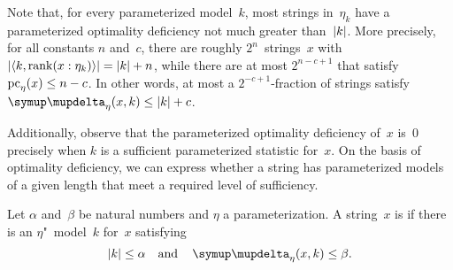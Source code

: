 Note that, for every parameterized model~$k$, most strings in~$\eta_k$ have a parameterized optimality deficiency not much greater than~${\lvert k\rvert}$.
More precisely, for all constants $n$ and~$c$, there are roughly $2^n$~strings~$x$ with ${\lvert{\langle k, \operatorname{rank}(x : \eta_k)\rangle}\rvert} = {\lvert k\rvert} + n$, while there are at most $2^{n - c + 1}$ that satisfy $\operatorname{pc}_\eta(x) \le n - c$.
In other words, at most a $2^{-c + 1}$-fraction of strings satisfy $\updelta_\eta(x, k) \le \length{k} + c$.

Additionally, observe that the parameterized optimality deficiency of~$x$ is~$0$ precisely when $k$ is a sufficient parameterized statistic for~$x$.
On the basis of optimality deficiency, we can express whether a string has parameterized models of a given length that meet a required level of sufficiency.
\begin{definition}
  Let $\alpha$ and~$\beta$ be natural numbers and $\eta$ a parameterization.
  A string~$x$ is  if there is an $\eta$"~model~$k$ for~$x$ satisfying
  \begin{equation*}
    \length{k} \le \alpha \quad\text{and}\quad \updelta_\eta(x, k) \le \beta.
  \end{equation*}
\end{definition}

